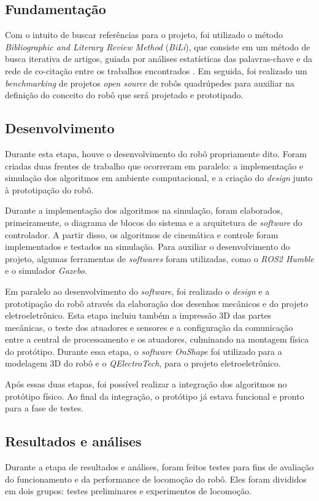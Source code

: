 \documentclass[conference]{IEEEtran}
\begin{document}
  \subsection{Fundamentação}
  Com o intuito de buscar referências para o projeto, foi utilizado o método \textit{Bibliographic and Literary Review Method} (\textit{BiLi}), que consiste em um método de busca iterativa de artigos, guiada por análises estatísticas das palavras-chave e da rede de co-citação entre os trabalhos encontrados \cite{bili}. Em seguida, foi realizado um \textit{benchmarking} de projetos \textit{open source} de robôs quadrúpedes para auxiliar na definição do conceito do robô que será projetado e prototipado.
  
  \subsection{Desenvolvimento}
  Durante esta etapa, houve o desenvolvimento do robô propriamente dito. Foram criadas duas frentes de trabalho que ocorreram em paralelo: a implementação e simulação dos algoritmos em ambiente computacional, e a criação do \textit{design} junto à prototipação do robô.

  Durante a implementação dos algoritmos na simulação, foram elaborados, primeiramente, o diagrama de blocos do sistema e a arquitetura de \textit{software} do controlador. A partir disso, os algoritmos de cinemática e controle foram implementados e testados na simulação. Para auxiliar o desenvolvimento do projeto, algumas ferramentas de \textit{softwares} foram utilizadas, como o \textit{ROS2 Humble} e o simulador \textit{Gazebo}.

  Em paralelo ao desenvolvimento do \textit{software}, foi realizado o \textit{design} e a prototipação do robô através da elaboração dos desenhos mecânicos e do projeto eletroeletrônico. Esta etapa incluiu também a impressão 3D das partes mecânicas, o teste dos atuadores e sensores e a configuração da comunicação entre a central de processamento e os atuadores, culminando na montagem física do protótipo. Durante essa etapa, o \textit{software} \textit{OnShape} foi utilizado para a modelagem 3D do robô e o \textit{QElectroTech}, para o projeto eletroeletrônico.

  Após essas duas etapas, foi possível realizar a integração dos algoritmos no protótipo físico. Ao final da integração, o protótipo já estava funcional e pronto para a fase de testes.

  \subsection{Resultados e análises}
  \label{sec:method_results_analysis}
  Durante a etapa de resultados e análises, foram feitos testes para fins de avaliação do funcionamento e da performance de locomoção do robô. Eles foram divididos em dois grupos: testes preliminares e experimentos de locomoção. 
  
\end{document}
